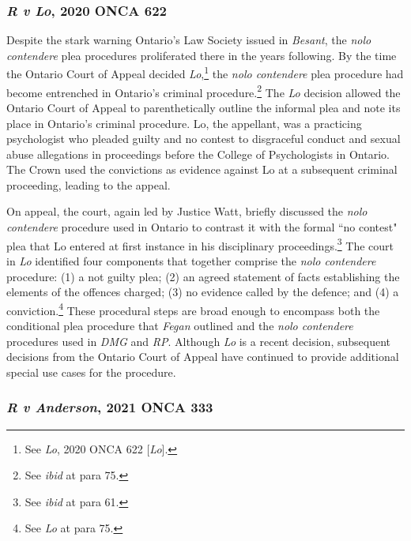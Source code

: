 \subsubsection{\textit{R v Lo}, 2020 ONCA 622}

Despite the stark warning Ontario's Law Society issued in \textit{Besant}, the \textit{nolo contendere} plea procedures proliferated there in the years following. By the time the Ontario Court of Appeal decided \textit{Lo},\footnote{See \textit{Lo}, 2020 ONCA 622 [\textit{Lo}].} the \textit{nolo contendere} plea procedure had become entrenched in Ontario's criminal procedure.\footnote{See \textit{ibid} at para 75.} The \textit{Lo} decision allowed the Ontario Court of Appeal to parenthetically outline the informal plea and note its place in Ontario's criminal procedure. Lo, the appellant, was a practicing psychologist who pleaded guilty and no contest to disgraceful conduct and sexual abuse allegations in proceedings before the College of Psychologists in Ontario. The Crown used the convictions as evidence against Lo at a subsequent criminal proceeding, leading to the appeal.

On appeal, the court, again led by Justice Watt, briefly discussed the \textit{nolo contendere} procedure used in Ontario to contrast it with the formal ``no contest" plea that Lo entered at first instance in his disciplinary proceedings.\footnote{See \textit{ibid} at para 61.} The court in \textit{Lo} identified four components that together comprise the \textit{nolo contendere} procedure: (1) a not guilty plea; (2) an agreed statement of facts establishing the elements of the offences charged; (3) no evidence called by the defence; and (4) a conviction.\footnote{See \textit{Lo} at para 75.} These procedural steps are broad enough to encompass both the conditional plea procedure that \textit{Fegan} outlined and the \textit{nolo contendere} procedures used in \textit{DMG} and \textit{RP}. Although \textit{Lo} is a recent decision, subsequent decisions from the Ontario Court of Appeal have continued to provide additional special use cases for the procedure.

\subsubsection{\textit{R v Anderson}, 2021 ONCA 333}

